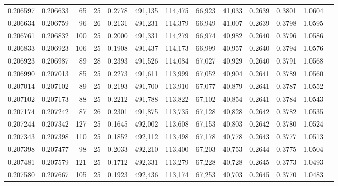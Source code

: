 \begin{tabular}{rrrrrrrrrrrrr}
0.206597 & 0.206633 &  65 &  25 &                                     0.2778 & 491,135 & 114,475 &  66,923 &  41,033 & 0.2639 & 0.3801 & 1.0604 \\
0.206634 & 0.206759 &  96 &  26 &                                     0.2131 & 491,231 & 114,379 &  66,949 &  41,007 & 0.2639 & 0.3798 & 1.0595 \\
0.206761 & 0.206832 & 100 &  25 &                                     0.2000 & 491,331 & 114,279 &  66,974 &  40,982 & 0.2640 & 0.3796 & 1.0586 \\
0.206833 & 0.206923 & 106 &  25 &                                     0.1908 & 491,437 & 114,173 &  66,999 &  40,957 & 0.2640 & 0.3794 & 1.0576 \\
0.206923 & 0.206987 &  89 &  28 &                                     0.2393 & 491,526 & 114,084 &  67,027 &  40,929 & 0.2640 & 0.3791 & 1.0568 \\
0.206990 & 0.207013 &  85 &  25 &                                     0.2273 & 491,611 & 113,999 &  67,052 &  40,904 & 0.2641 & 0.3789 & 1.0560 \\
0.207014 & 0.207102 &  89 &  25 &                                     0.2193 & 491,700 & 113,910 &  67,077 &  40,879 & 0.2641 & 0.3787 & 1.0552 \\
0.207102 & 0.207173 &  88 &  25 &                                     0.2212 & 491,788 & 113,822 &  67,102 &  40,854 & 0.2641 & 0.3784 & 1.0543 \\
0.207174 & 0.207242 &  87 &  26 &                                     0.2301 & 491,875 & 113,735 &  67,128 &  40,828 & 0.2642 & 0.3782 & 1.0535 \\
0.207244 & 0.207342 & 127 &  25 &                                     0.1645 & 492,002 & 113,608 &  67,153 &  40,803 & 0.2642 & 0.3780 & 1.0524 \\
0.207343 & 0.207398 & 110 &  25 &                                     0.1852 & 492,112 & 113,498 &  67,178 &  40,778 & 0.2643 & 0.3777 & 1.0513 \\
0.207398 & 0.207477 &  98 &  25 &                                     0.2033 & 492,210 & 113,400 &  67,203 &  40,753 & 0.2644 & 0.3775 & 1.0504 \\
0.207481 & 0.207579 & 121 &  25 &                                     0.1712 & 492,331 & 113,279 &  67,228 &  40,728 & 0.2645 & 0.3773 & 1.0493 \\
0.207580 & 0.207667 & 105 &  25 &                                     0.1923 & 492,436 & 113,174 &  67,253 &  40,703 & 0.2645 & 0.3770 & 1.0483 \\

\end{tabular}
